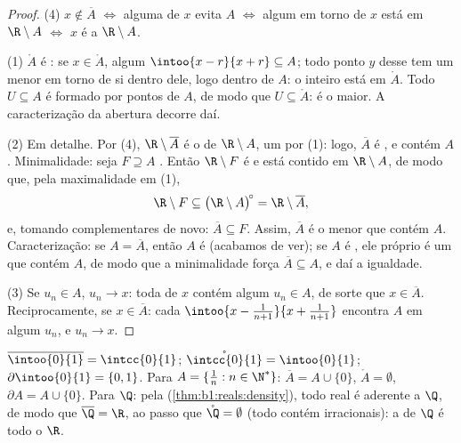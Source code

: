 \begin{proof}
(4) $x \notin \overline A$ $\iff$ alguma  de $x$ evita $A$
$\iff$ algum  em torno de $x$ está em $\R \setminus A$ $\iff$ $x$
é  a $\R \setminus A$.

(1) $\mathring A$ é : se $x \in \mathring A$, algum
$\intoo{x-r}{x+r} \subseteq A$; todo ponto $y$ desse  tem um 
menor em torno de si dentro dele, logo dentro de $A$: o 
inteiro está em $\mathring A$. Todo  $U \subseteq A$ é formado por
pontos  de $A$, de modo que $U \subseteq \mathring A$: é o maior. A
caracterização da abertura decorre daí.

(2) Em detalhe. Por (4), $\R \setminus \overline A$ é o 
de $\R \setminus A$, um  por (1): logo, $\overline A$ é
, e contém $A$. Minimalidade: seja $F \supseteq A$ .
Então $\R \setminus F$ é  e está contido em $\R
\setminus A$, de modo que, pela maximalidade em (1),
\[
\R \setminus F \subseteq \bigl(\R \setminus A\bigr)^{\!\circ}
= \R \setminus \overline A ,
\]
e, tomando complementares de novo: $\overline A \subseteq F$. Assim,
$\overline A$ é o menor  que contém $A$. Caracterização:
se $A = \overline A$, então $A$ é  (acabamos de ver); se $A$ é
, ele próprio é um  que contém $A$, de modo que a
minimalidade força $\overline A \subseteq A$, e daí a igualdade.

(3) Se $u_n \in A$, $u_n \to x$: toda  de $x$ contém
algum $u_n \in A$, de sorte que $x \in \overline A$. Reciprocamente, se $x \in
\overline A$: cada  $\intoo{x - \frac{1}{n+1}}{x +
\frac{1}{n+1}}$ encontra $A$ em algum $u_n$, e $u_n \to x$.
\end{proof}

\begin{example}\label{ex:b1:topology:closureexamples}
$\overline{\intoo{0}{1}} = \intcc{0}{1}$;
$\mathring{\intcc{0}{1}} = \intoo{0}{1}$; $\partial\intoo{0}{1} =
\{0, 1\}$. Para $A = \{\frac 1n : n \in \N^*\}$: $\overline A = A
\cup \{0\}$, $\mathring A = \emptyset$, $\partial A = A \cup \{0\}$.
Para $\Q$: pela  (\cref{thm:b1:reals:density}), todo real é
aderente a $\Q$, de modo que $\overline{\Q} = \R$, ao passo que $\mathring{\Q} =
\emptyset$ (todo  contém irracionais): a  de
$\Q$ é todo o $\R$.
\end{example}

